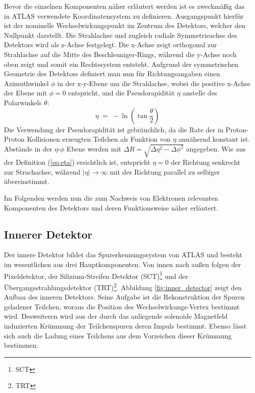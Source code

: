 Bevor die einzelnen Komponenten näher erläutert werden ist es zweckmäßig das in
ATLAS verwendete Koordinatensystem zu definieren. Ausgangspunkt hierfür ist der
nominelle Wechselwirkungspunkt im Zentrum des Detektors, welcher den Nullpunkt
darstellt. Die Strahlachse und zugleich radiale Symmetrieachse des Detektors
wird als z-Achse festgelegt. Die x-Achse zeigt orthogonal zur Strahlachse auf
die Mitte des Beschleuniger-Rings, während die y-Achse noch oben zeigt und
somit ein Rechtssystem entsteht. Aufgrund der symmetrischen Geometrie des
Detektors definiert man nun für Richtungsangaben einen Azimuthwinkel
$\phi$ in der x-y-Ebene um die Strahlachse, wobei die positive x-Achse der
Ebene mit $\phi=0$ entspricht, und die Pseudorapidität $\eta$ anstelle des
Polarwinkels $\theta$:
\begin{equation}
    \eta \; = \; - \ln \left( \tan\frac{\theta}{2} \right)
    \label{eq:eta}
\end{equation}
Die Verwendung der Pseudorapidität ist gebräuchlich, da die Rate der in
Proton-Proton Kollisionen erzeugten Teilchen als Funktion von $\eta$ annähernd
konstant ist. Abstände in der $\eta$-$\phi$ Ebene werden mit
$\Delta R=\sqrt{\Delta\eta^2-\Delta\phi^2}$ angegeben. Wie aus der Definition
(\ref{eq:eta}) ersichtlich ist, entspricht $\eta=0$ der Richtung senkrecht zur
Strachachse, während $|\eta| \rightarrow \infty$ mit der Richtung parallel zu
selbiger übereinstimmt.

Im Folgenden werden nun die zum Nachweis von Elektronen relevanten Komponenten
des Detektors und deren Funktionsweise näher erläutert.



\subsection{Innerer Detektor}
\label{inner_detector}

Der innere Detektor bildet das Spurerkennungssystem von ATLAS und besteht im
wesentlichen aus drei Hauptkomponenten. Von innen nach außen folgen der
Pixeldetektor, der Silizium-Streifen Detektor (\acs{SCT})\footnote{\acf{SCT}}
und der Übergangsstrahlungsdetektor (\acs{TRT})\footnote{\acf{TRT}}. Abbildung
\ref{fig:inner_detector} zeigt den Aufbau des inneren Detektors. Seine Aufgabe
ist die Rekonstruktion der Spuren geladener Teilchen, woraus die Position des
Wechselwirkungs-Vertex bestimmt wird. Desweiteren wird aus der durch das
anliegende solenoide Magnetfeld induzierten Krümmung der Teilchenspuren deren
Impuls bestimmt. Ebenso lässt sich auch die Ladung eines Teilchens aus dem
Vorzeichen dieser Krümmung bestimmen.

